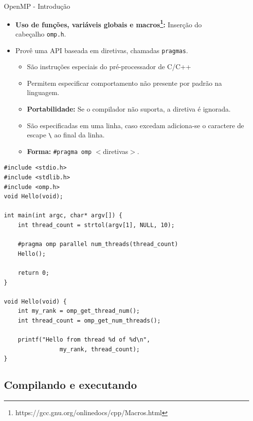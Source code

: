 \begin{frame}{OpenMP - Introdução}
	\begin{itemize}
		\item \textbf{Uso de funções, variáveis globais e macros\footnote{https://gcc.gnu.org/onlinedocs/cpp/Macros.html}:} Inserção do\\ cabeçalho \texttt{omp.h}.
		\pause
		\medskip
		\item Provê uma API baseada em diretivas, chamadas \texttt{pragmas}.
		\medskip
		\begin{itemize}
			\item São instruções especiais do pré-processador de C/C++
			\smallskip
			\item Permitem especificar comportamento não presente por padrão na linguagem.
			\smallskip
			\item \textbf{Portabilidade:} Se o compilador não suporta, a diretiva é ignorada.
			\smallskip
			\item São especificadas em uma linha, caso excedam adiciona-se o caractere de escape \texttt{\textbackslash} ao final da linha.
			\smallskip
			\item \textbf{Forma:} \texttt{\#pragma omp} $<$diretivas$>$.
		\end{itemize}
	\end{itemize}
\end{frame}

\begin{frame}[fragile]
	\fontsize{8.5pt}{7.2}\selectfont
\begin{lstlisting}[caption=omp\_hello.c]
#include <stdio.h>
#include <stdlib.h>
#include <omp.h>
void Hello(void);

int main(int argc, char* argv[]) {
	int thread_count = strtol(argv[1], NULL, 10);

	#pragma omp parallel num_threads(thread_count)
	Hello();

	return 0;
}

void Hello(void) {
	int my_rank = omp_get_thread_num();
	int thread_count = omp_get_num_threads();

	printf("Hello from thread %d of %d\n", 
	            my_rank, thread_count);
}
	\end{lstlisting}
	\fontsize{10pt}{7.2}\selectfont	
\end{frame}

\subsection{Compilando e executando}

